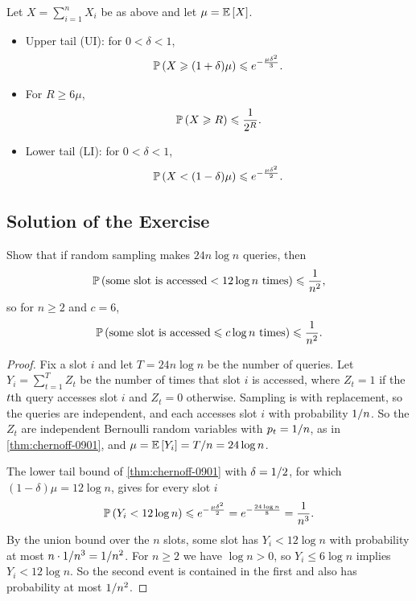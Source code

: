 \begin{theorem}\label{thm:chernoff-0901}
    Let $X = \sum_{i=1}^{n} X_i$ be as above and let $\mu = \operatorname{\mathbb{E}}\left[X\right]$.
    \begin{itemize}
        \item Upper tail (UI): for $0 < \delta < 1$,
              \[\operatorname{\mathbb{P}}\left(X \geqslant (1+\delta)\mu\right) \leqslant e^{-\frac{\mu \delta^2}{3}}.\]
        \item For $R \geq 6\mu$,
              \[\operatorname{\mathbb{P}}\left(X \geqslant R\right) \leqslant \frac{1}{2^R}.\]
        \item Lower tail (LI): for $0 < \delta < 1$,
              \[\operatorname{\mathbb{P}}\left(X < (1-\delta)\mu\right) \leqslant e^{-\frac{\mu \delta^2}{2}}.\]
    \end{itemize}
\end{theorem}

\subsection{Solution of the Exercise}\label{sec:exercise-0901}

\begin{exercisebox}
\begin{exercise}\label{ex:maxload-0901}\label{lem:maxload-lower-0901}
    Show that if random sampling makes $24 n \log n$ queries, then
    \[\operatorname{\mathbb{P}}\left(\text{some slot is accessed} < 12 \log n \text{ times}\right) \leqslant \frac{1}{n^2},\]
    so for $n \geq 2$ and $c = 6$,
    \[\operatorname{\mathbb{P}}\left(\text{some slot is accessed} \leqslant c \log n \text{ times}\right) \leqslant \frac{1}{n^2}.\]
\end{exercise}
\tcblower
\begin{proof}
    Fix a slot $i$ and let $T = 24 n \log n$ be the number of queries. Let
    $Y_i = \sum_{t=1}^{T} Z_t$ be the number of times that slot $i$ is accessed, where $Z_t = 1$ if
    the $t\text{th}$ query accesses slot $i$ and $Z_t = 0$ otherwise. Sampling is with replacement, so
    the queries are independent, and each accesses slot $i$ with probability $1/n$. So the
    $Z_t$ are independent Bernoulli random variables with $p_t = 1/n$, as in
    \cref{thm:chernoff-0901}, and $\mu = \operatorname{\mathbb{E}}\left[Y_i\right] = T/n = 24 \log n$.

    The lower tail bound of \cref{thm:chernoff-0901} with $\delta = 1/2$, for which
    $(1 - \delta)\mu = 12 \log n$, gives for every slot $i$
    \[\operatorname{\mathbb{P}}\left(Y_i < 12 \log n\right) \leqslant e^{-\frac{\mu \delta^2}{2}}
        = e^{-\frac{24 \log n}{8}} = \frac{1}{n^3}.\]
    By the union bound over the $n$ slots, some slot has $Y_i < 12 \log n$ with probability at
    most $n \cdot 1/n^3 = 1/n^2$. For $n \geq 2$ we have $\log n > 0$, so
    $Y_i \leq 6 \log n$ implies $Y_i < 12 \log n$. So the second event is contained in the first and
    also has probability at most $1/n^2$.
\end{proof}
\end{exercisebox}
